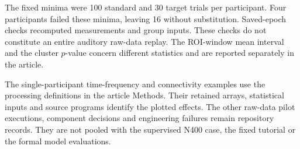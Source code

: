 The fixed minima were 100 standard and 30 target trials per participant. Four participants failed these minima, leaving 16 without substitution. Saved-epoch checks recomputed measurements and group inputs. These checks do not constitute an entire auditory raw-data replay. The ROI-window mean interval and the cluster \(p\)-value concern different statistics and are reported separately in the article.

The single-participant time-frequency and connectivity examples use the processing definitions in the article Methods. Their retained arrays, statistical inputs and source programs identify the plotted effects. The other raw-data pilot executions, component decisions and engineering failures remain repository records. They are not pooled with the supervised N400 case, the fixed tutorial or the formal model evaluations.
